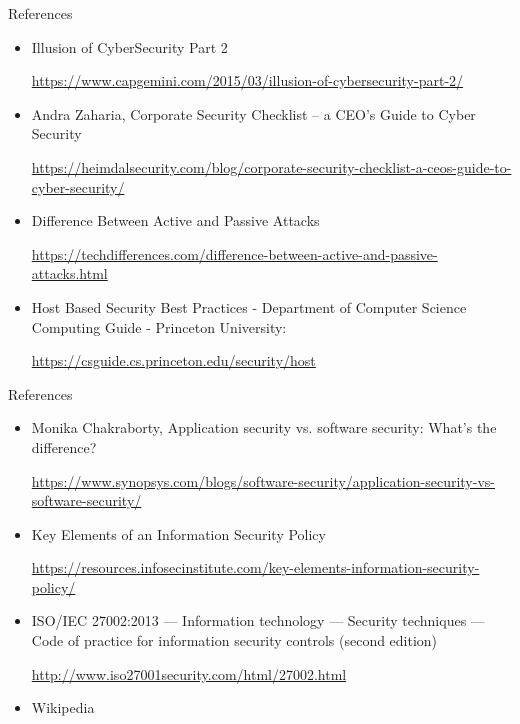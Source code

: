 \documentclass[pdf]{beamer}
\begin{document}
\begin{frame}{References}
\begin{itemize}
\item
Illusion of CyberSecurity Part 2

\url{https://www.capgemini.com/2015/03/illusion-of-cybersecurity-part-2/}

\item
Andra Zaharia, Corporate Security Checklist – a CEO’s Guide to Cyber Security

\url{https://heimdalsecurity.com/blog/corporate-security-checklist-a-ceos-guide-to-cyber-security/}

\item
Difference Between Active and Passive Attacks

\url{https://techdifferences.com/difference-between-active-and-passive-attacks.html}

\item
Host Based Security Best Practices - Department of Computer Science Computing Guide - Princeton University:

\url{https://csguide.cs.princeton.edu/security/host}

\end{itemize}
\end{frame}



\begin{frame}{References}
\begin{itemize}
\item
Monika Chakraborty, Application security vs. software security: What’s the difference?

\url{https://www.synopsys.com/blogs/software-security/application-security-vs-software-security/}

\item
Key Elements of an Information Security Policy

\url{https://resources.infosecinstitute.com/key-elements-information-security-policy/}

\item
ISO/IEC 27002:2013 — Information technology — Security techniques — Code of practice for information security controls (second edition) 

\url{http://www.iso27001security.com/html/27002.html}

\item
Wikipedia
\end{itemize}
\end{frame}
\end{document}
